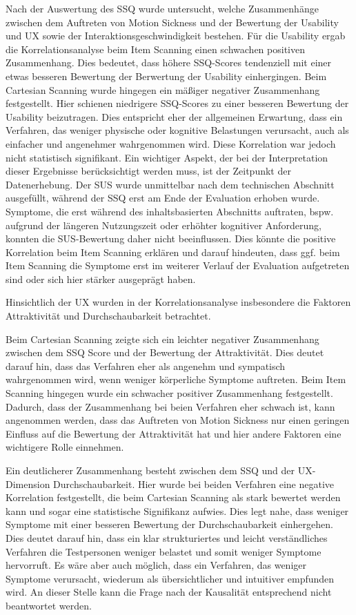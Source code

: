 Nach der Auswertung des SSQ wurde untersucht, welche Zusammenhänge zwischen dem Auftreten von Motion Sickness und der Bewertung der Usability und UX sowie der Interaktionsgeschwindigkeit bestehen.
Für die Usability ergab die Korrelationsanalyse beim Item Scanning einen schwachen positiven Zusammenhang. Dies bedeutet, dass höhere SSQ-Scores tendenziell mit einer etwas besseren Bewertung der Berwertung der Usability einhergingen. Beim Cartesian Scanning wurde hingegen ein mäßiger negativer Zusammenhang festgestellt. Hier schienen niedrigere SSQ-Scores zu einer besseren Bewertung der Usability beizutragen. Dies entspricht eher der allgemeinen Erwartung, dass ein Verfahren, das weniger physische oder kognitive Belastungen verursacht, auch als einfacher und angenehmer wahrgenommen wird. Diese Korrelation war jedoch nicht statistisch signifikant. Ein wichtiger Aspekt, der bei der Interpretation dieser Ergebnisse berücksichtigt werden muss, ist der Zeitpunkt der Datenerhebung. Der SUS wurde unmittelbar nach dem technischen Abschnitt ausgefüllt, während der SSQ erst am Ende der Evaluation erhoben wurde. Symptome, die erst während des inhaltsbasierten Abschnitts auftraten, bspw. aufgrund der längeren Nutzungszeit oder erhöhter kognitiver Anforderung, konnten die SUS-Bewertung daher nicht beeinflussen. Dies könnte die positive Korrelation beim Item Scanning erklären und darauf hindeuten, dass ggf. beim Item Scanning die Symptome erst im weiterer Verlauf der Evaluation aufgetreten sind oder sich hier stärker ausgeprägt haben.

Hinsichtlich der UX wurden in der Korrelationsanalyse insbesondere die Faktoren Attraktivität und Durchschaubarkeit betrachtet. 

Beim Cartesian Scanning zeigte sich ein leichter negativer Zusammenhang zwischen dem SSQ Score und der Bewertung der Attraktivität. Dies deutet darauf hin, dass das Verfahren eher als angenehm und sympatisch wahrgenommen wird, wenn weniger körperliche Symptome auftreten. Beim Item Scanning hingegen wurde ein schwacher positiver Zusammenhang festgestellt. Dadurch, dass der Zusammenhang bei beien Verfahren eher schwach ist, kann angenommen werden, dass das Auftreten von Motion Sickness nur einen geringen Einfluss auf die Bewertung der Attraktivität hat und hier andere Faktoren eine wichtigere Rolle einnehmen. 

Ein deutlicherer Zusammenhang besteht zwischen dem SSQ und der UX-Dimension Durchschaubarkeit. Hier wurde bei beiden Verfahren eine negative Korrelation festgestellt, die beim Cartesian Scanning als stark bewertet werden kann und sogar eine statistische Signifikanz aufwies. Dies legt nahe, dass weniger Symptome mit einer besseren Bewertung der Durchschaubarkeit einhergehen. Dies deutet darauf hin, dass ein klar strukturiertes und leicht verständliches Verfahren die Testpersonen weniger belastet und somit weniger Symptome hervorruft. Es wäre aber auch möglich, dass ein Verfahren, das weniger Symptome verursacht, wiederum als übersichtlicher und intuitiver empfunden wird. An dieser Stelle kann die Frage nach der Kausalität entsprechend nicht beantwortet werden. 


